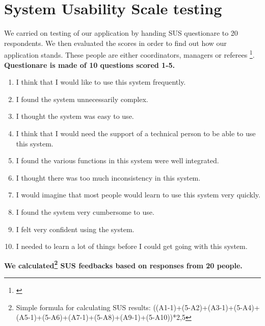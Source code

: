 \section{System Usability Scale testing}
We carried on testing of our application by handing SUS questionare to 20 respondents. We then evaluated the scores in order to find out how our application stands. These people are either coordinators, managers or referees \footnote{\cite{SUSDesc}}. 
\newline
\textbf{Questionare is made of 10 questions scored 1-5.}
\begin{enumerate}
    \item I think that I would like to use this system frequently.
    \item I found the system unnecessarily complex.
    \item I thought the system was easy to use.
    \item I think that I would need the support of a technical person to be able to use this system.
    \item I found the various functions in this system were well integrated.
    \item I thought there was too much inconsistency in this system.
    \item I would imagine that most people would learn to use this system very quickly.
    \item I found the system very cumbersome to use.
    \item I felt very confident using the system.
    \item I needed to learn a lot of things before I could get going with this system.
\end{enumerate}
\textbf{We calculated\footnote{Simple formula for calculating SUS results: ((A1-1)+(5-A2)+(A3-1)+(5-A4)+(A5-1)+(5-A6)+(A7-1)+(5-A8)+(A9-1)+(5-A10))*2,5} SUS feedbacks based on responses from 20 people.}
\newline
